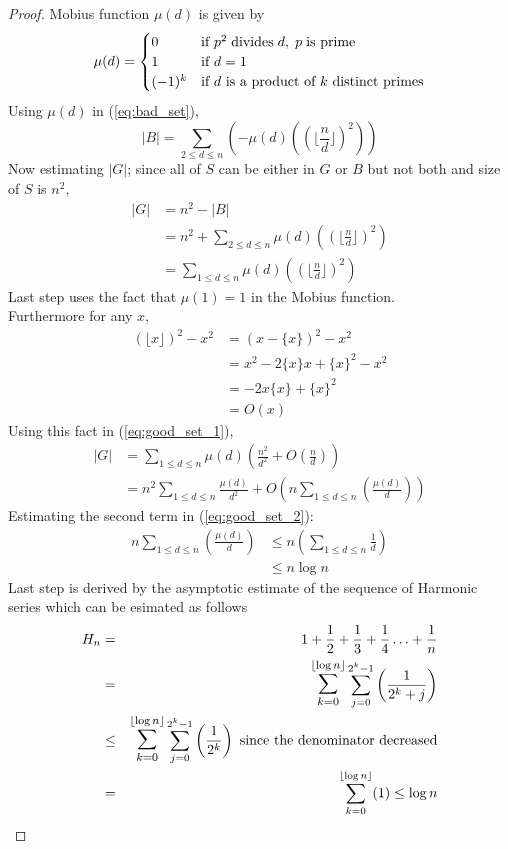 \begin{proof}
Mobius function $\mu(d)$ is given by
\[
  \mu(d) = 
  \begin{cases}
    0 &\mbox{if } p^2 \hspace{0.1cm} \text{divides} \hspace{0.1cm} d, \hspace{0.1cm} p  \hspace{0.1cm} \text{is prime}\\
    1 &\mbox{if } d = 1\\
    (-1)^k &\mbox{if } d \text{ is a product of }k \text{ distinct primes} 
  \end{cases}
\]
Using $\mu(d)$ in (\ref{eq:bad_set}),
$$|B| = \sum_{2 \le d \le n}(-\mu(d) ((\lfloor \frac{n}{d} \rfloor)^2))$$
Now estimating $|G|$; since all of $S$ can be either in $G$ or $B$ but not both and size of $S$ is $n^2$,
\begin{align}
|G| &= n^2 - |B|\nonumber \\
&= n^2 + \sum_{2 \le d \le n}\mu(d) ((\lfloor \frac{n}{d} \rfloor)^2)\nonumber \\
&= \sum_{1 \le d \le n}\mu(d) ((\lfloor \frac{n}{d} \rfloor)^2) \label{eq:good_set_1}
\end{align}
Last step uses the fact that $\mu(1) = 1$ in the Mobius function.\\
 Furthermore for any $x$,
\begin{align*}
(\lfloor x \rfloor )^2 - x^2 &= (x-\{x\})^2 - x^2\\
&= x^2 - 2\{x\}x + \{x\}^2 -x^2\\
&= -2x\{x\} + \{x\}^2\\
&= O(x)
\end{align*}
Using this fact in (\ref{eq:good_set_1}),
\begin{align}
|G| &= \sum_{1 \le d \le n}\mu(d) (\frac{n^2}{d^2} + O(\frac{n}{d}))\nonumber \\
&= n^2 \sum_{1 \le d \le n}\frac{\mu(d)}{d^2} +  O(n \sum_{1 \le d \le n}(\frac{\mu(d)}{d})) \label{eq:good_set_2}
\end{align}
Estimating the second term in (\ref{eq:good_set_2}): 
\begin{align}
n \sum_{1 \le d \le n}(\frac{\mu(d)}{d}) &\le n (\sum_{1 \le d \le n}\frac{1}{d})\nonumber \\
&\le n \log{n} \label{eq:term_2_in_good_set}
\end{align}
Last step is derived by the asymptotic estimate of the sequence of Harmonic series
which can be esimated as follows
\begin{eqnarray*}
H_n & = & 1+\frac{1}{2}+\frac{1}{3}+\frac{1}{4} \ldots +\frac{1}{n} \\
& = & \bigsum_{k=0}^{\lfloor \log n \rfloor} \sum_{j=0}^{2^k -1} \left( \frac{1}{2^k+j} \right) \\
& \le & \bigsum_{k=0}^{\lfloor \log n \rfloor} \sum_{j=0}^{2^k -1} \left( \frac{1}{2^k} \right) \textrm{ since the denominator decreased} \\
& = &  \sum_{k=0}^{\lfloor \log n \rfloor} (1) \le \log n 
\end{eqnarray*}


\end{proof}
